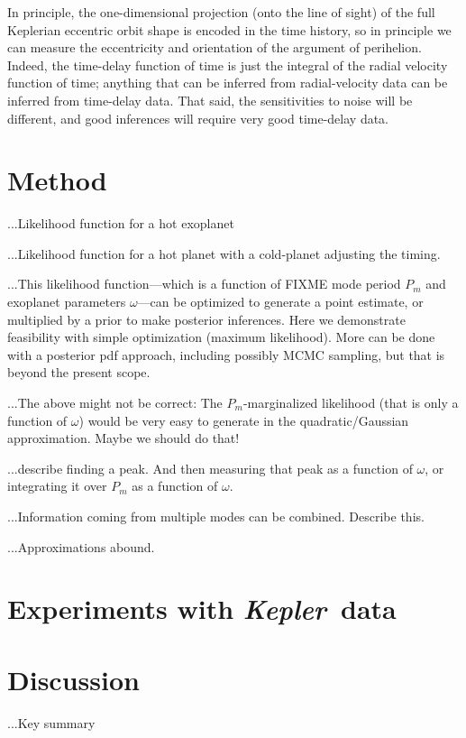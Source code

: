 \documentclass[12pt, preprint]{aastex}
\newcommand{\project}[1]{\textsl{#1}}
\newcommand{\Kepler}{\project{Kepler}}
\begin{document}
In principle, the one-dimensional projection (onto the line of sight)
of the full Keplerian eccentric orbit shape is encoded in the time
history, so in principle we can measure the eccentricity and
orientation of the argument of perihelion.
Indeed, the time-delay function of time is just the integral of the
radial velocity function of time; anything that can be inferred from
radial-velocity data can be inferred from time-delay data.
That said, the sensitivities to noise will be different, and good
inferences will require very good time-delay data.

\section{Method}

...Likelihood function for a hot exoplanet

...Likelihood function for a hot planet with a cold-planet adjusting the timing.

...This likelihood function---which is a function of FIXME mode period $P_m$
and exoplanet parameters $\omega$---can be optimized to generate a
point estimate, or multiplied by a prior to make posterior inferences.
Here we demonstrate feasibility with simple optimization (maximum
likelihood).
More can be done with a posterior pdf approach, including possibly
MCMC sampling, but that is beyond the present scope.

...The above might not be correct: The $P_m$-marginalized likelihood
(that is only a function of $\omega$) would be very easy to generate
in the quadratic/Gaussian approximation.  Maybe we should do that!

...describe finding a peak.  And then measuring that peak as a
function of $\omega$, or integrating it over $P_m$ as a function of
$\omega$.

...Information coming from multiple modes can be combined.  Describe
this.

...Approximations abound.

\section{Experiments with \Kepler\ data}

\section{Discussion}

...Key summary
\end{document}
